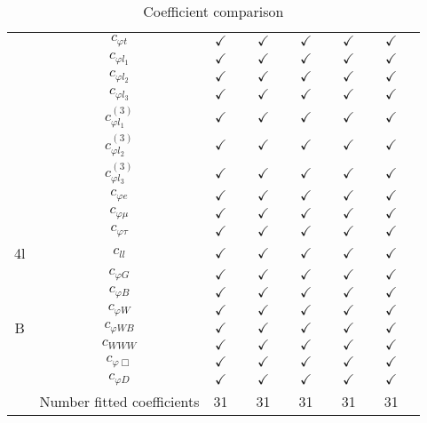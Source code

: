\documentclass{article}
\begin{document}
\begin{table}[H]
\begin{tabular}{|c|c|c|c|c|c|c|c|c|c|c|c|}
 & $c_{\varphi t}$ & $\checkmark$ &  & $\checkmark$ &  & $\checkmark$ &  & $\checkmark$ &  & $\checkmark$ & \\ \cline{2-12}
 & $c_{\varphi l_1}$ & $\checkmark$ &  & $\checkmark$ &  & $\checkmark$ &  & $\checkmark$ &  & $\checkmark$ & \\ \cline{2-12}
 & $c_{\varphi l_2}$ & $\checkmark$ &  & $\checkmark$ &  & $\checkmark$ &  & $\checkmark$ &  & $\checkmark$ & \\ \cline{2-12}
 & $c_{\varphi l_3}$ & $\checkmark$ &  & $\checkmark$ &  & $\checkmark$ &  & $\checkmark$ &  & $\checkmark$ & \\ \cline{2-12}
 & $c_{\varphi l_1}^{(3)}$ & $\checkmark$ &  & $\checkmark$ &  & $\checkmark$ &  & $\checkmark$ &  & $\checkmark$ & \\ \cline{2-12}
 & $c_{\varphi l_2}^{(3)}$ & $\checkmark$ &  & $\checkmark$ &  & $\checkmark$ &  & $\checkmark$ &  & $\checkmark$ & \\ \cline{2-12}
 & $c_{\varphi l_3}^{(3)}$ & $\checkmark$ &  & $\checkmark$ &  & $\checkmark$ &  & $\checkmark$ &  & $\checkmark$ & \\ \cline{2-12}
 & $c_{\varphi e}$ & $\checkmark$ &  & $\checkmark$ &  & $\checkmark$ &  & $\checkmark$ &  & $\checkmark$ & \\ \cline{2-12}
 & $c_{\varphi \mu}$ & $\checkmark$ &  & $\checkmark$ &  & $\checkmark$ &  & $\checkmark$ &  & $\checkmark$ & \\ \cline{2-12}
 & $c_{\varphi \tau}$ & $\checkmark$ &  & $\checkmark$ &  & $\checkmark$ &  & $\checkmark$ &  & $\checkmark$ & 
\\ \hline
\multirow{1}{*}{4l}
 & $c_{ll}$ & $\checkmark$ &  & $\checkmark$ &  & $\checkmark$ &  & $\checkmark$ &  & $\checkmark$ & 
\\ \hline
\multirow{7}{*}{B}
 & $c_{\varphi G}$ & $\checkmark$ &  & $\checkmark$ &  & $\checkmark$ &  & $\checkmark$ &  & $\checkmark$ & \\ \cline{2-12}
 & $c_{\varphi B}$ & $\checkmark$ &  & $\checkmark$ &  & $\checkmark$ &  & $\checkmark$ &  & $\checkmark$ & \\ \cline{2-12}
 & $c_{\varphi W}$ & $\checkmark$ &  & $\checkmark$ &  & $\checkmark$ &  & $\checkmark$ &  & $\checkmark$ & \\ \cline{2-12}
 & $c_{\varphi WB}$ & $\checkmark$ &  & $\checkmark$ &  & $\checkmark$ &  & $\checkmark$ &  & $\checkmark$ & \\ \cline{2-12}
 & $c_{WWW}$ & $\checkmark$ &  & $\checkmark$ &  & $\checkmark$ &  & $\checkmark$ &  & $\checkmark$ & \\ \cline{2-12}
 & $c_{\varphi \Box}$ & $\checkmark$ &  & $\checkmark$ &  & $\checkmark$ &  & $\checkmark$ &  & $\checkmark$ & \\ \cline{2-12}
 & $c_{\varphi D}$ & $\checkmark$ &  & $\checkmark$ &  & $\checkmark$ &  & $\checkmark$ &  & $\checkmark$ & 
\\ \hline
\hline & Number fitted coefficients & 31 &  & 31 &  & 31 &  & 31 &  & 31 &  \\ \hline
\end{tabular}
\caption{Coefficient comparison}
\end{table}
\end{document}
